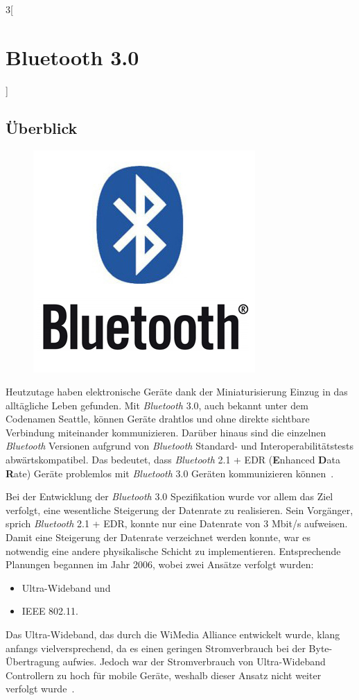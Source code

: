 \begin{multicols}{3}[\section{Bluetooth 3.0}]
\subsection*{Überblick}
\begin{figure}
  \vspace{-20pt}
  \begin{center}
  	\hspace{-20pt}
    \includegraphics[width=0.7\linewidth]{Kapitel/Bluetooth3.0/Grafiken/logo.jpg}
  \end{center}
  \vspace{-15pt}
\end{figure}
Heutzutage haben elektronische Geräte dank der Miniaturisierung Einzug in das alltägliche Leben gefunden. Mit \textit{Bluetooth} 3.0, auch bekannt unter dem Codenamen Seattle, können Geräte drahtlos und ohne direkte sichtbare Verbindung miteinander kommunizieren. Darüber hinaus sind die einzelnen \textit{Bluetooth} Versionen aufgrund von \textit{Bluetooth} Standard- und Interoperabilitätstests abwärtskompatibel. Das bedeutet, dass \textit{Bluetooth} 2.1 + EDR (\textbf{E}nhanced \textbf{D}ata \textbf{R}ate) Geräte problemlos mit \textit{Bluetooth} 3.0 Geräten kommunizieren können~\cite{bluetooth3.0.1}. 

Bei der Entwicklung der \textit{Bluetooth} 3.0 Spezifikation wurde vor allem das Ziel verfolgt, eine wesentliche Steigerung der Datenrate zu realisieren. Sein Vorgänger, sprich \textit{Bluetooth} 2.1 + EDR, konnte nur eine Datenrate von 3 Mbit/s aufweisen. Damit eine Steigerung der Datenrate verzeichnet werden konnte, war es notwendig eine andere physikalische Schicht zu implementieren. Entsprechende Planungen begannen im Jahr 2006, wobei zwei Ansätze verfolgt wurden: 
\begin{itemize}
	\item Ultra-Wideband  und
	\item IEEE 802.11.
\end{itemize} 
Das Ultra-Wideband, das durch die WiMedia Alliance entwickelt wurde, klang anfangs vielversprechend, da es einen geringen Stromverbrauch bei der Byte-Übertragung aufwies. Jedoch war der Stromverbrauch von Ultra-Wideband Controllern zu hoch für mobile Geräte, weshalb dieser Ansatz nicht weiter verfolgt wurde~\cite{bluetooth3.0.2}. 


\end{multicols}

